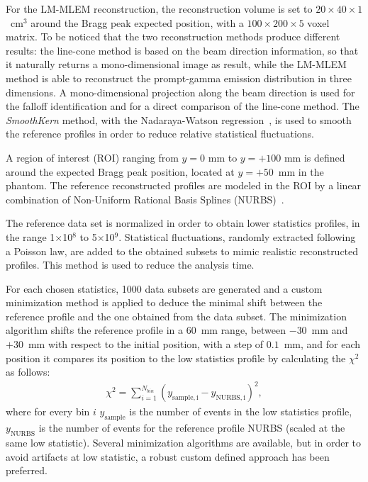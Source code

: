 For the LM-MLEM reconstruction, the reconstruction volume is set to $20\times40\times1$~cm$^3$ around the Bragg peak expected position, with a $100\times200\times5$ voxel matrix. To be noticed that the two reconstruction methods produce different results: the line-cone method is based on the beam direction information, so that it naturally returns a mono-dimensional image as result, while the LM-MLEM method is able to reconstruct the prompt-gamma emission distribution in three dimensions. A mono-dimensional projection along the beam direction is used for the falloff identification and for a direct comparison of the line-cone method.
The \textit{SmoothKern} method, with the Nadaraya-Watson regression~\cite{Nadaraya_regression, Watson_regression}, is used to smooth the reference profiles in order to reduce relative statistical fluctuations.

A region of interest (ROI) ranging from $y=0$ mm to $y=+100$ mm is defined around the expected Bragg peak position, located at $y=+50$~mm in the phantom. The reference reconstructed profiles are modeled in the ROI by a linear combination of Non-Uniform Rational Basis Splines (NURBS)~\cite{NURBS}. 

The reference data set is normalized in order to obtain lower statistics profiles, in the range 1$\times$10$^8$ to 5$\times$10$^9$. Statistical fluctuations, randomly extracted following a Poisson law, are added to the obtained subsets to mimic realistic reconstructed profiles. This method is used to reduce the analysis time.

For each chosen statistics, 1000 data subsets are generated and a custom minimization method is applied to deduce the minimal shift between the reference profile and the one obtained from the data subset. The minimization algorithm shifts the reference profile in a 60~mm range, between $-30$~mm and $+30$~mm with respect to the initial position, with a step of $0.1$~mm, and for each position it compares its position to the low statistics profile by calculating the $\chi^2$ as follows:
\begin{eqnarray}
\chi^2 = \sum\limits_{i=1}^{N_{bin}} {(y_{\mathrm{sample,i}}-y_{\mathrm{NURBS,i}})^2},
\end{eqnarray}
where for every bin $i$ $y_{\mathrm{sample}}$ is the number of events in the low statistics profile, $y_{\mathrm{NURBS}}$ is the number of events for the reference profile NURBS (scaled at the same low statistic). Several minimization algorithms are available, but in order to avoid artifacts at low statistic, a robust custom defined approach has been preferred.

